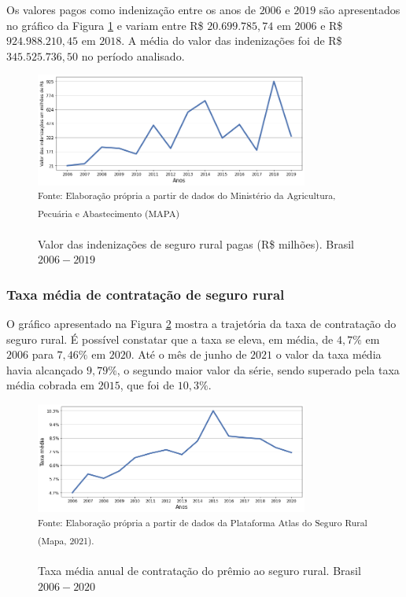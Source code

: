 Os valores pagos como indenização entre os anos de $2006$ e $2019$ são apresentados no gráfico da Figura \ref{valor_indenizacoes} e variam entre R\$ $20.699.785,74$ em $2006$ e R\$ $924.988.210,45$ em $2018$. A média do valor das indenizações foi de R\$ $345.525.736,50$ no período analisado. 

\begin{figure}[H]
	\centering
	\caption{Valor das indenizações de seguro rural pagas (R\$ milhões). Brasil $2006 - 2019$}
	\includegraphics[width=0.8\textwidth]{figuras/valor_indenizacoes.png}\\
	\small \textsuperscript {Fonte: Elaboração própria a partir de dados do Ministério da Agricultura, Pecuária e Abastecimento (MAPA)}
    \label{valor_indenizacoes}
\end{figure}

\subsubsection{Taxa média de contratação de seguro rural}

O gráfico apresentado na Figura \ref{taxa_media} mostra a trajetória da taxa de contratação do seguro rural. É possível constatar que a taxa se eleva, em média, de $4,7\%$ em $2006$ para $ 7,46\%$ em $2020$. Até o mês de junho de $2021$ o valor da taxa média havia alcançado $9,79\%$, o segundo maior valor da série, sendo superado pela taxa média cobrada em $2015$, que foi de $10,3\%$.  

\begin{figure}[H]
	\centering
	\caption{Taxa média anual de contratação do prêmio ao seguro rural. Brasil $2006 - 2020$}
	\includegraphics[width=0.8\textwidth]{figuras/taxa_media.png}\\
	\small \textsuperscript {Fonte: Elaboração própria a partir de dados da Plataforma Atlas do Seguro Rural (Mapa, 2021).}
   \label{taxa_media}
\end{figure}

